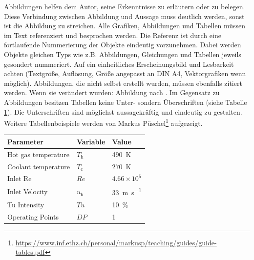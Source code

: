 Abbildungen helfen dem Autor, seine Erkenntnisse zu erläutern oder zu belegen. Diese Verbindung zwischen Abbildung und Aussage muss deutlich werden, sonst ist die Abbildung zu streichen. Alle Grafiken, Abbildungen und Tabellen müssen im Text referenziert und besprochen werden. Die Referenz ist durch eine fortlaufende Nummerierung der Objekte eindeutig vorzunehmen. Dabei werden Objekte gleichen Typs wie z.B. Abbildungen, Gleichungen und Tabellen jeweils gesondert nummeriert. Auf ein einheitliches Erscheinungsbild und Lesbarkeit achten (Textgröße, Auflösung, Größe angepasst an DIN A4, Vektorgrafiken wenn möglich). Abbildungen, die nicht selbst erstellt wurden, müssen ebenfalls zitiert werden. Wenn sie verändert wurden: \glqq Abbildung nach \cite{schoof2014}\grqq. Im Gegensatz zu Abbildungen besitzen Tabellen keine Unter- sondern Überschriften (siehe Tabelle \ref{tab:experiment-parameters}). Die Unterschriften sind möglichst aussagekräftig und eindeutig zu gestalten. Weitere Tabellenbeispiele werden von Markus Püschel\footnote{\url{https://www.inf.ethz.ch/personal/markusp/teaching/guides/guide-tables.pdf}} aufgezeigt. 



\begin{table}[htbp]
	\centering
	\renewcommand{\arraystretch}{1.3} %
	\begin{tabular}{@{}lll@{}}
		\toprule
		Parameter           &   Variable   &           Value            \\ \midrule
		Hot gas temperature & $T_\text{h}$ &     \SI{490}{\kelvin}      \\
		Coolant temperature & $T_\text{c}$ &     \SI{270}{\kelvin}      \\
		Inlet Re            &     $Re$     &      $4.66\times10^5$      \\
		Inlet Velocity      & $u_\text{h}$ & \SI{33}{\meter\per\second} \\
		Tu Intensity        &     $Tu$     &     \SI{10}{\percent}      \\
		Operating Points    &     $DP$     &             1              \\ \bottomrule
	\end{tabular}
	\label{tab:experiment-parameters}
\end{table}


